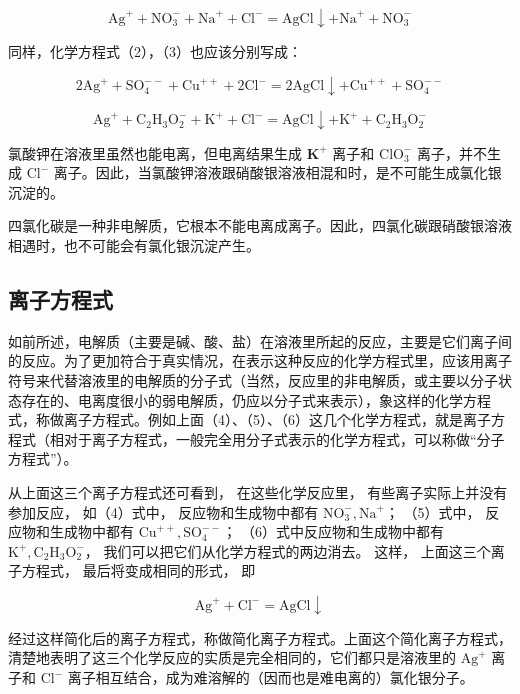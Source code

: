 \[
\mathrm{Ag} ^ {+} + \mathrm{NO} _ {3} ^ {-} + \mathrm{Na} ^ {+} + \mathrm{Cl} ^ {-} = \mathrm{AgCl} \downarrow + \mathrm{Na} ^ {+} + \mathrm{NO} _ {3} ^ {-} \tag {4}
\]

同样，化学方程式（2），（3）也应该分别写成：

\[
2 \mathrm{Ag} ^ {+} + \mathrm{SO} _ {4} ^ {- -} + \mathrm{Cu} ^ {+ +} + 2 \mathrm{Cl} ^ {-} = 2 \mathrm{AgCl} \downarrow + \mathrm{Cu} ^ {+ +} + \mathrm{SO} _ {4} ^ {- -} \tag {5}
\]

\[
\mathrm{Ag} ^ {+} + \mathrm{C} _ {2} \mathrm{H} _ {3} \mathrm{O} _ {2} ^ {-} + \mathrm{K} ^ {+} + \mathrm{Cl} ^ {-} = \mathrm{AgCl} \downarrow + \mathrm{K} ^ {+} + \mathrm{C} _ {2} \mathrm{H} _ {3} \mathrm{O} _ {2} ^ {-} \tag {6}
\]

氯酸钾在溶液里虽然也能电离，但电离结果生成 \(\mathbf{K}^{+}\) 离子和
\(\mathrm{ClO}_3^-\) 离子，并不生成 \(\mathrm{Cl}^-\)
离子。因此，当氯酸钾溶液跟硝酸银溶液相混和时，是不可能生成氯化银沉淀的。

四氯化碳是一种非电解质，它根本不能电离成离子。因此，四氯化碳跟硝酸银溶液相遇时，也不可能会有氯化银沉淀产生。

\subsection{离子方程式}

如前所述，电解质（主要是碱、酸、盐）在溶液里所起的反应，主要是它们离子间的反应。为了更加符合于真实情况，在表示这种反应的化学方程式里，应该用离子符号来代替溶液里的电解质的分子式（当然，反应里的非电解质，或主要以分子状态存在的、电离度很小的弱电解质，仍应以分子式来表示），象这样的化学方程式，称做离子方程式。例如上面（4）、（5）、（6）这几个化学方程式，就是离子方程式（相对于离子方程式，一般完全用分子式表示的化学方程式，可以称做``分子方程式''）。

从上面这三个离子方程式还可看到， 在这些化学反应里，
有些离子实际上并没有参加反应， 如（4）式中， 反应物和生成物中都有
\(\mathrm{NO}_{3}^{-}, \mathrm{Na}^{+}\)； （5）式中，
反应物和生成物中都有 \(\mathrm{Cu}^{++}, \mathrm{SO}_{4}^{--}\)；
（6）式中反应物和生成物中都有
\(\mathrm{K}^{+}, \mathrm{C}_{2} \mathrm{H}_{3} \mathrm{O}_{2}^{-}\)，
我们可以把它们从化学方程式的两边消去。 这样， 上面这三个离子方程式，
最后将变成相同的形式， 即

\[
\mathrm{Ag} ^ {+} + \mathrm{Cl} ^ {-} = \mathrm{AgCl} \downarrow
\]

经过这样简化后的离子方程式，称做简化离子方程式。上面这个简化离子方程式，清楚地表明了这三个化学反应的实质是完全相同的，它们都只是溶液里的
\(\mathrm{Ag}^{+}\) 离子和 \(\mathrm{Cl}^{-}\)
离子相互结合，成为难溶解的（因而也是难电离的）氯化银分子。

